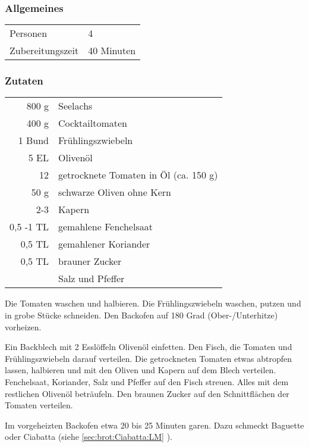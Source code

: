 \subsubsection*{Allgemeines}
\begin{tabular}{ll}
    Personen         &  4   \\
    Zubereitungszeit & 40 Minuten  \\
\end{tabular} 
\subsubsection*{Zutaten}
\begin{tabular}{r l}
        800 g & Seelachs                              \\
        400 g & Cocktailtomaten                       \\
       1 Bund & Frühlingszwiebeln                     \\
         5 EL & Olivenöl                              \\
           12 & getrocknete Tomaten in Öl (ca. 150 g) \\
         50 g & schwarze Oliven ohne Kern             \\
          2-3 & Kapern                                \\
    0,5 -1 TL & gemahlene Fenchelsaat                 \\
       0,5 TL & gemahlener Koriander                  \\
       0,5 TL & brauner Zucker                        \\
              & Salz und Pfeffer
\end{tabular}

Die Tomaten waschen und halbieren. Die Frühlingszwiebeln waschen, putzen und in grobe Stücke schneiden. Den Backofen auf 180 Grad (Ober-/Unterhitze) vorheizen.

Ein Backblech mit 2 Esslöffeln Olivenöl einfetten. Den Fisch, die Tomaten und Frühlingszwiebeln darauf verteilen. Die getrockneten Tomaten etwas abtropfen lassen, halbieren und mit den Oliven und Kapern auf dem Blech verteilen. Fenchelsaat, Koriander, Salz und Pfeffer auf den Fisch streuen. Alles mit dem restlichen Olivenöl beträufeln. Den braunen Zucker auf den Schnittflächen der Tomaten verteilen.

Im vorgeheizten Backofen etwa 20 bis 25 Minuten garen. Dazu schmeckt Baguette oder Ciabatta (siehe \vref{sec:brot:Ciabatta:LM} ).

